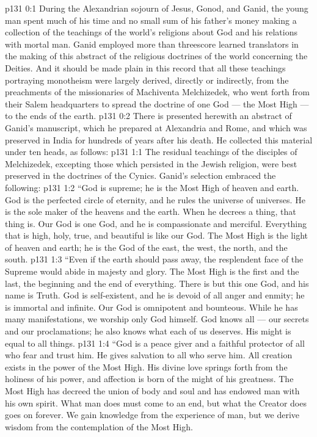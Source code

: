 \author{Midwayer Commission}
\vs p131 0:1 During the Alexandrian sojourn of Jesus, Gonod, and Ganid, the young man spent much of his time and no small sum of his father’s money making a collection of the teachings of the world’s religions about God and his relations with mortal man. Ganid employed more than threescore learned translators in the making of this abstract of the religious doctrines of the world concerning the Deities. And it should be made plain in this record that all these teachings portraying monotheism were largely derived, directly or indirectly, from the preachments of the missionaries of Machiventa Melchizedek, who went forth from their Salem headquarters to spread the doctrine of one God --- the Most High --- to the ends of the earth.
\vs p131 0:2 There is presented herewith an abstract of Ganid’s manuscript, which he prepared at Alexandria and Rome, and which was preserved in India for hundreds of years after his death. He collected this material under ten heads, as follows:
\vs p131 1:1 The residual teachings of the disciples of Melchizedek, excepting those which persisted in the Jewish religion, were best preserved in the doctrines of the Cynics. Ganid’s selection embraced the following:
\vs p131 1:2 \pc “God is supreme; he is the Most High of heaven and earth. God is the perfected circle of eternity, and he rules the universe of universes. He is the sole maker of the heavens and the earth. When he decrees a thing, that thing is. Our God is one God, and he is compassionate and merciful. Everything that is high, holy, true, and beautiful is like our God. The Most High is the light of heaven and earth; he is the God of the east, the west, the north, and the south.
\vs p131 1:3 “Even if the earth should pass away, the resplendent face of the Supreme would abide in majesty and glory. The Most High is the first and the last, the beginning and the end of everything. There is but this one God, and his name is Truth. God is self\hyp{}existent, and he is devoid of all anger and enmity; he is immortal and infinite. Our God is omnipotent and bounteous. While he has many manifestations, we worship only God himself. God knows all --- our secrets and our proclamations; he also knows what each of us deserves. His might is equal to all things.
\vs p131 1:4 “God is a peace giver and a faithful protector of all who fear and trust him. He gives salvation to all who serve him. All creation exists in the power of the Most High. His divine love springs forth from the holiness of his power, and affection is born of the might of his greatness. The Most High has decreed the union of body and soul and has endowed man with his own spirit. What man does must come to an end, but what the Creator does goes on forever. We gain knowledge from the experience of man, but we derive wisdom from the contemplation of the Most High.
